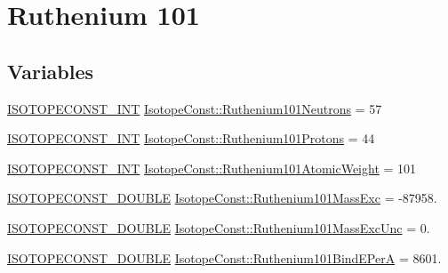 \hypertarget{group___isotope_const-_ruthenium-_ru101}{}\section{Ruthenium 101}
\label{group___isotope_const-_ruthenium-_ru101}
\subsection*{Variables}
\begin{DoxyCompactItemize}
\item 
\mbox{\hyperlink{group___isotope_const-_macros_ga5f18360b3e99483a35c32d789e62621c}{I\+S\+O\+T\+O\+P\+E\+C\+O\+N\+S\+T\+\_\+\+I\+NT}} \mbox{\hyperlink{group___isotope_const-_ruthenium-_ru101_ga9536cf62a1334a2b205968becc4e8b31}{Isotope\+Const\+::\+Ruthenium101\+Neutrons}} = 57
\item 
\mbox{\hyperlink{group___isotope_const-_macros_ga5f18360b3e99483a35c32d789e62621c}{I\+S\+O\+T\+O\+P\+E\+C\+O\+N\+S\+T\+\_\+\+I\+NT}} \mbox{\hyperlink{group___isotope_const-_ruthenium-_ru101_ga54cae460445a08f58f4e839ceb599c34}{Isotope\+Const\+::\+Ruthenium101\+Protons}} = 44
\item 
\mbox{\hyperlink{group___isotope_const-_macros_ga5f18360b3e99483a35c32d789e62621c}{I\+S\+O\+T\+O\+P\+E\+C\+O\+N\+S\+T\+\_\+\+I\+NT}} \mbox{\hyperlink{group___isotope_const-_ruthenium-_ru101_ga1053306da28a56f574222ee4eb7f428b}{Isotope\+Const\+::\+Ruthenium101\+Atomic\+Weight}} = 101
\item 
\mbox{\hyperlink{group___isotope_const-_macros_ga8f45a7272ce02c0b4c65c44636ed719a}{I\+S\+O\+T\+O\+P\+E\+C\+O\+N\+S\+T\+\_\+\+D\+O\+U\+B\+LE}} \mbox{\hyperlink{group___isotope_const-_ruthenium-_ru101_gabee4f74a338e36b07565dd73ab6d5fe9}{Isotope\+Const\+::\+Ruthenium101\+Mass\+Exc}} = -\/87958.
\item 
\mbox{\hyperlink{group___isotope_const-_macros_ga8f45a7272ce02c0b4c65c44636ed719a}{I\+S\+O\+T\+O\+P\+E\+C\+O\+N\+S\+T\+\_\+\+D\+O\+U\+B\+LE}} \mbox{\hyperlink{group___isotope_const-_ruthenium-_ru101_ga51c7f01b38e86c46f5aa85947bf52648}{Isotope\+Const\+::\+Ruthenium101\+Mass\+Exc\+Unc}} = 0.
\item 
\mbox{\hyperlink{group___isotope_const-_macros_ga8f45a7272ce02c0b4c65c44636ed719a}{I\+S\+O\+T\+O\+P\+E\+C\+O\+N\+S\+T\+\_\+\+D\+O\+U\+B\+LE}} \mbox{\hyperlink{group___isotope_const-_ruthenium-_ru101_ga43cd04fb4f3ccd710865ec0bee832e35}{Isotope\+Const\+::\+Ruthenium101\+Bind\+E\+PerA}} = 8601.
\item 

\end{DoxyCompactItemize}
